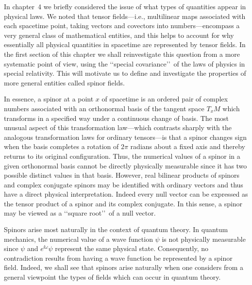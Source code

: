 
\begingroup
\edef\chapterthirteenpreviousfootnote{\number\value{footnote}}
\setcounter{footnote}{0}

In chapter~4 we briefly considered the issue of what types of quantities appear in
physical laws. We noted that tensor fields---i.e., multilinear maps associated with
each spacetime point, taking vectors and covectors into numbers---encompass a very
general class of mathematical entities, and this helps to account for why essentially
all physical quantities in spacetime are represented by tensor fields. In the first
section of this chapter we shall reinvestigate this question from a more systematic
point of view, using the \lq\lq special covariance\rq\rq\ of the laws of physics in
special relativity. This will motivate us to define and investigate the properties of
more general entities called spinor fields.

In essence, a spinor at a point \(x\) of spacetime is an ordered pair of complex
numbers associated with an orthonormal basis of the tangent space \(T_xM\) which
transforms in a specified way under a continuous change of basis. The most unusual
aspect of this transformation law---which contrasts sharply with the analogous
transformation laws for ordinary tensors---is that a spinor changes sign when the
basis completes a rotation of \(2\pi\) radians about a fixed axis and thereby returns
to its original configuration. Thus, the numerical values of a spinor in a given
orthonormal basis cannot be directly physically measurable since it has two possible
distinct values in that basis. However, real bilinear products of spinors and complex
conjugate spinors may be identified with ordinary vectors and thus have a direct
physical interpretation. Indeed every null vector can be expressed as the tensor
product of a spinor and its complex conjugate. In this sense, a spinor may be viewed
as a \lq\lq square root\rq\rq\ of a null vector.

Spinors arise most naturally in the context of quantum theory. In quantum mechanics,
the numerical value of a wave function \(\psi\) is not physically measurable since
\(\psi\) and \(e^{\ii\omega}\psi\) represent the same physical state. Consequently,
no contradiction results from having a wave function be represented by a spinor
field. Indeed, we shall see that spinors arise naturally when one considers from a
general viewpoint the types of fields which can occur in quantum theory.

